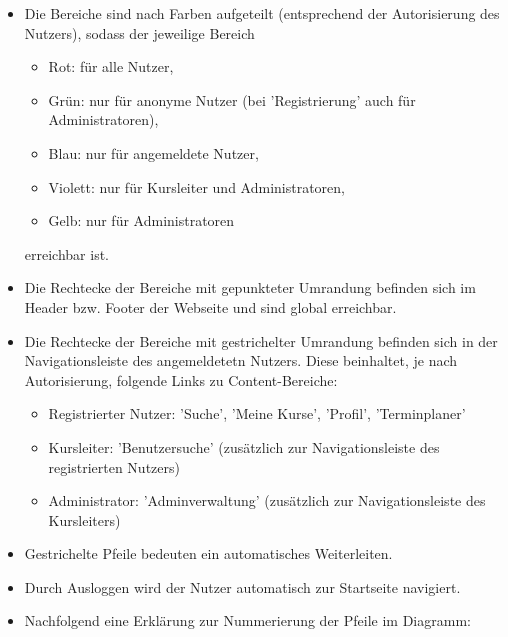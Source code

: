 \documentclass[a4paper]{scrreprt}
\begin{document}
		\begin{itemize}
			\item Die Bereiche sind  nach Farben aufgeteilt (entsprechend der Autorisierung des Nutzers), sodass der jeweilige Bereich
		\begin{itemize}
		    \item Rot: für alle Nutzer,
		    \item Grün: nur für anonyme Nutzer (bei 'Registrierung' auch für Administratoren),
		    \item Blau: nur für angemeldete Nutzer,
		    \item Violett: nur für Kursleiter und Administratoren,
		    \item Gelb: nur für Administratoren
	    \end{itemize}
	    erreichbar ist.
		\item Die Rechtecke der Bereiche mit gepunkteter Umrandung befinden sich im  Header bzw. Footer der Webseite und sind global erreichbar.
		\item Die Rechtecke der Bereiche mit gestrichelter Umrandung befinden sich in der Navigationsleiste des angemeldetetn Nutzers. Diese beinhaltet, je nach Autorisierung, folgende Links zu Content-Bereiche:
		
		\begin{itemize}
		\item Registrierter Nutzer: 'Suche', 'Meine Kurse', 'Profil', 'Terminplaner'
		\item Kursleiter: 'Benutzersuche' (zusätzlich zur Navigationsleiste des registrierten Nutzers)
		\item Administrator: 'Adminverwaltung' (zusätzlich zur Navigationsleiste des Kursleiters)
		\end{itemize}		
		
	    \item Gestrichelte Pfeile bedeuten ein automatisches Weiterleiten.
	    \item Durch Ausloggen wird der Nutzer automatisch zur Startseite navigiert.
	    
	    \item Nachfolgend eine Erklärung zur Nummerierung der Pfeile im Diagramm:
	    

\end{itemize}
\end{document}
